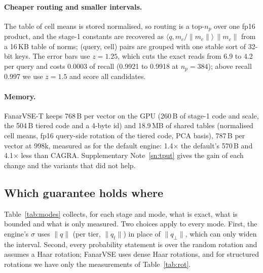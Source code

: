 \documentclass[fleqn,10pt]{wlscirep}
\begin{document}
\paragraph{Cheaper routing and smaller intervals.} The table of cell means is stored normalised, so routing is a top-$n_p$ over one fp16 product, and the stage-1 constants are recovered as $\langle q,m_c/\|m_c\|\rangle\,\|m_c\|$ from a 16\,KB table of norms; (query, cell) pairs are grouped with one stable sort of 32-bit keys. The error bars use $z=1.25$, which cuts the exact reads from 6.9 to 4.2 per query and costs 0.0003 of recall (0.9921 to 0.9918 at $n_p=384$); above recall 0.997 we use $z=1.5$ and score all candidates.

\paragraph{Memory.} FanarVSE-T keeps 768\,B per vector on the GPU (260\,B of stage-1 code and scale, the 504\,B tiered code and a 4-byte id) and 18.9\,MB of shared tables (normalised cell means, fp16 query-side rotation of the tiered code, PCA basis), 787\,B per vector at 998k, measured as for the default engine: 1.4$\times$ the default's 570\,B and 4.1$\times$ less than CAGRA. Supplementary Note~\ref{sn:tput} gives the gain of each change and the variants that did not help.

\subsection{Which guarantee holds where}\label{sec:modes}
Table~\ref{tab:modes} collects, for each stage and mode, what is exact, what is bounded and what is only measured. Two choices apply to every mode. First, the engine's $\sigma$ uses $\|q\|$ (per tier, $\|q_t\|$) in place of $\|q_\perp\|$, which can only widen the interval. Second, every probability statement is over the random rotation and assumes a Haar rotation; FanarVSE uses dense Haar rotations, and for structured rotations we have only the measurements of Table~\ref{tab:rot}.
\end{document}
